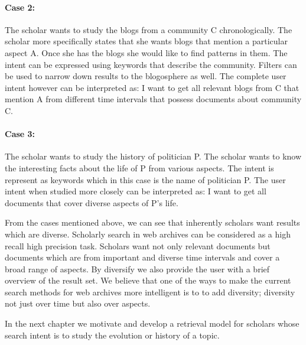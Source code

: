 \paragraph{Case 2:} %
\label{par:paragraph_name}
The scholar wants to study the blogs from a community C chronologically. The scholar more specifically states that she wants blogs that mention a particular aspect A. Once she has the blogs she would like to find patterns in them. The intent can be expressed using keywords that describe the community. Filters can be used to narrow down results to the blogosphere as well. The complete user intent however can be interpreted as: I want to get all relevant blogs from C that mention A from different time intervals that possess documents about community C.

\paragraph{Case 3:} %
\label{par:paragraph_name}
The scholar wants to study the history of politician P. The scholar wants to know the interesting facts about the life of P from various aspects. The intent is represent as keywords which in this case is the name of politician P. The user intent when studied more closely can be interpreted as: I want to get all documents that cover diverse aspects of P's life.

From the cases mentioned above, we can see that inherently scholars want results which are diverse. Scholarly search in web archives can be considered as a high recall high precision task. Scholars want not only relevant documents but documents which are from important and diverse time intervals and cover a broad range of aspects. By diversify we also provide the user with a brief overview of the result set. We believe that one of the ways to make the current search methods for web archives more intelligent is to to add diversity; diversity not just over time but also over aspects. 

In the next chapter we motivate and develop a retrieval model for scholars whose search intent is to study the evolution or history of a topic.






